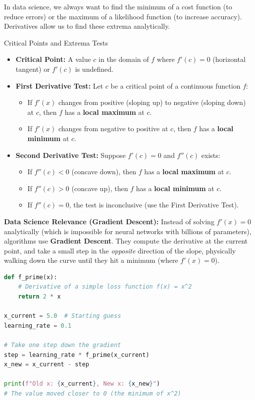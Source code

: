 In data science, we always want to find the minimum of a cost function (to reduce errors) or the maximum of a likelihood function (to increase accuracy). Derivatives allow us to find these extrema analytically.

\begin{definitionbox}{Critical Points and Extrema Tests}
\begin{itemize}
    \item \textbf{Critical Point:} A value $c$ in the domain of $f$ where $f'(c) = 0$ (horizontal tangent) or $f'(c)$ is undefined.
    \item \textbf{First Derivative Test:} Let $c$ be a critical point of a continuous function $f$:
        \begin{itemize}
            \item If $f'(x)$ changes from positive (sloping up) to negative (sloping down) at $c$, then $f$ has a \textbf{local maximum} at $c$.
            \item If $f'(x)$ changes from negative to positive at $c$, then $f$ has a \textbf{local minimum} at $c$.
        \end{itemize}
    \item \textbf{Second Derivative Test:} Suppose $f'(c) = 0$ and $f''(c)$ exists:
        \begin{itemize}
            \item If $f''(c) < 0$ (concave down), then $f$ has a \textbf{local maximum} at $c$.
            \item If $f''(c) > 0$ (concave up), then $f$ has a \textbf{local minimum} at $c$.
            \item If $f''(c) = 0$, the test is inconclusive (use the First Derivative Test).
        \end{itemize}
\end{itemize}
\end{definitionbox}

\textbf{Data Science Relevance (Gradient Descent):} Instead of solving $f'(x) = 0$ analytically (which is impossible for neural networks with billions of parameters), algorithms use \textbf{Gradient Descent}. They compute the derivative at the current point, and take a small step in the \textit{opposite} direction of the slope, physically walking down the curve until they hit a minimum (where $f'(x) = 0$).

\begin{lstlisting}[language=Python, caption=Data Science: Gradient Descent Step in Python]
def f_prime(x):
    # Derivative of a simple loss function f(x) = x^2
    return 2 * x

x_current = 5.0  # Starting guess
learning_rate = 0.1

# Take one step down the gradient
step = learning_rate * f_prime(x_current)
x_new = x_current - step

print(f"Old x: {x_current}, New x: {x_new}")
# The value moved closer to 0 (the minimum of x^2)
\end{lstlisting}

